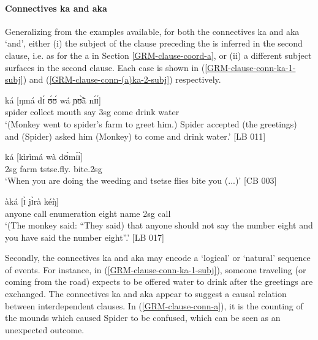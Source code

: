 \paragraph{Connectives {\sls ka} and {\sls aka}}
\label{GRM-clause-coord-ka-aka}

Generalizing from the examples available, for both the connectives {\sls ka} 
and 
{\sls aka} `and', either (i) the subject of the clause preceding the  is 
inferred in the second clause, i.e. as for  the   {\sls a} in Section \ref{GRM-clause-coord-a}, or 
(ii) a different subject surfaces in the second clause. Each case is shown in 
(\ref{GRM-clause-conn-ka-1-subj}) and (\ref{GRM-clause-conn-(a)ka-2-subj}) 
respectively.   


\ea\label{GRM-clause-conn-ka-1-subj} 
 ká  [ŋmá dɪ́ ʊ́ʊ́  
wá  
ɲʊ̃̀ã̀ nɪ́ɪ́]\\
spider collect mouth {\postp}  {\conn} say {\comp}  
{\sc 3sg}  come   drink water\\
\glt  `(Monkey went to spider's farm to greet him.) Spider accepted
(the
greetings) and (Spider) asked him (Monkey) to come and drink water.'  [LB 011]
 \z



\ea\label{GRM-clause-conn-(a)ka-2-subj} 

\ea\label{GRM-clause-conn-ka-2-subj} 
\gll  [dɪ̀  ɪ̀    wáà    párà]  ká [kìrìmá  wà 
dʊ́mɪ́ɪ́]\\
{\conn} {\sc 2sg} {\ingr}  farm {\conn} 
tstse.fly.{\pl}  {\ingr}  bite.{\sc 2sg}\\
\glt  `When  you are doing the weeding and  tsetse flies bite
you (...)' [CB 003]

\newpage
\ex\label{GRM-clause-conn-aka-2-subj} 
 àká [ɪ̀ jɪ̀rà   kéŋ̀]\\
{\comp}   anyone     {\neg}   {\itr} {\ingr}  
   call   enumeration    
eight name   {\conn}   {\sc 2sg}   call  {\dxm}\\
\glt  `(The monkey said:  ``They said) that anyone should not say the
number eight and you have said the number eight''.' [LB
017] 

\z 
 \z


Secondly, the connectives  {\sls ka} and {\sls aka}  may encode a `logical' or `natural' sequence of events.   For instance, in (\ref{GRM-clause-conn-ka-1-subj}), someone traveling (or coming from the road) expects to be offered water to drink after the greetings are exchanged. The  connectives  {\sls ka} and {\sls aka} appear to suggest a causal relation between interdependent clauses. In (\ref{GRM-clause-conn-a}), it is the counting of the mounds which caused Spider to be confused, which can be seen as an unexpected outcome.  

